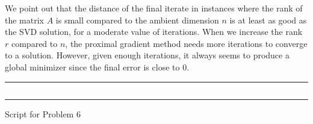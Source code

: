 \documentclass[10pt]{article}
\begin{document}
We point out that the distance of the final iterate in instances where the rank
of the matrix $A$ is small compared to the ambient dimension $n$ is at least as
good as the SVD solution, for a moderate value of iterations. When we increase
the rank $r$ compared to $n$, the proximal gradient method needs more
iterations to converge to a solution. However, given enough iterations, it
always seems to produce a global minimizer since the final error is close to
$0$.

\begin{longlisting}
    \vspace{2em}
    \hrule
	\inputminted{python}{hw2_p6.py}
    \hrule \vspace{1em}
	\caption{Script for Problem 6}
	\label{p6code}
\end{longlisting}

\vspace{2em}
\end{document}
